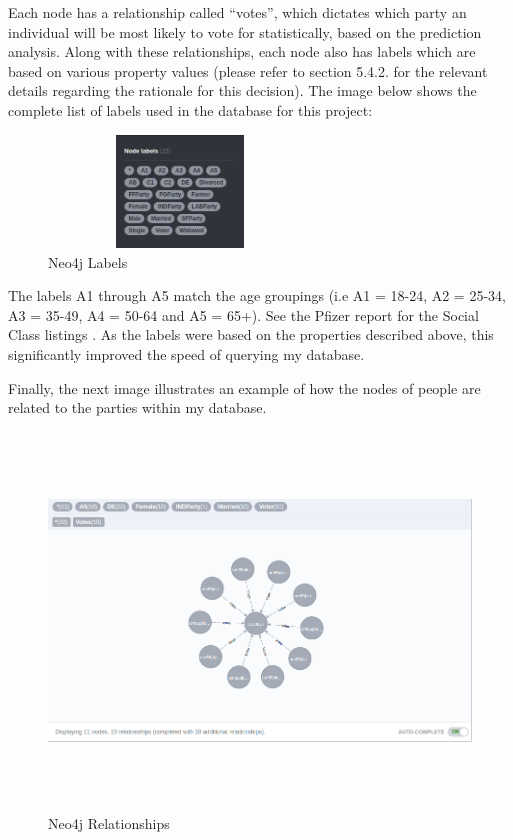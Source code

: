 Each node has a relationship called “votes”, which dictates which party an individual will be most likely to vote for statistically, based on the prediction analysis. Along with these relationships, each node also has labels which are based on various property values (please refer to section 5.4.2. for the relevant details regarding the rationale for this decision). The image below shows the complete list of labels used in the database for this project:
\begin{figure}[h]
	\caption{Neo4j Labels}
	\centering
	\includegraphics[width=7cm, height=3cm]{img/neo4j-labels}
\end{figure}
\linebreak

The labels A1 through A5 match the age groupings (i.e A1 = 18-24, A2 = 25-34, A3 = 35-49, A4 = 50-64 and A5 = 65+). See the Pfizer report for the Social Class listings \cite{pfizer}. As the labels were based on the properties described above, this significantly improved the speed of querying my database. 
\pagebreak

Finally, the next image illustrates an example of how the nodes of people are related to the parties within my database. 
\begin{figure}[h]
	\caption{Neo4j Relationships}
	\centering
	\includegraphics[width=15cm, height=10cm]{img/neo4-relationships}
\end{figure}
\pagebreak

